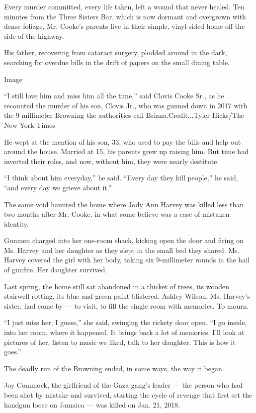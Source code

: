 Every murder committed, every life taken, left a wound that never
healed. Ten minutes from the Three Sisters Bar, which is now dormant and
overgrown with dense foliage, Mr. Cooke's parents live in their simple,
vinyl-sided home off the side of the highway.

His father, recovering from cataract surgery, plodded around in the
dark, searching for overdue bills in the drift of papers on the small
dining table.

Image

``I still love him and miss him all the time,'' said Clovis Cooke Sr.,
as he recounted the murder of his son, Clovis Jr., who was gunned down
in 2017 with the 9-millimeter Browning the authorities call
Briana.Credit...Tyler Hicks/The New York Times

He wept at the mention of his son, 33, who used to pay the bills and
help out around the house. Married at 15, his parents grew up raising
him. But time had inverted their roles, and now, without him, they were
nearly destitute.

``I think about him everyday,'' he said. ``Every day they kill people,''
he said, ``and every day we grieve about it.''

The same void haunted the home where Jody Ann Harvey was killed less
than two months after Mr. Cooke, in what some believe was a case of
mistaken identity.

Gunmen charged into her one-room shack, kicking open the door and firing
on Ms. Harvey and her daughter as they slept in the small bed they
shared. Ms. Harvey covered the girl with her body, taking six
9-millimeter rounds in the hail of gunfire. Her daughter survived.

Last spring, the home still sat abandoned in a thicket of trees, its
wooden stairwell rotting, its blue and green paint blistered. Ashley
Wilson, Ms. Harvey's sister, had come by --- to visit, to fill the
single room with memories. To mourn.

``I just miss her, I guess,'' she said, swinging the rickety door open.
``I go inside, into her room, where it happened. It brings back a lot of
memories. I'll look at pictures of her, listen to music we liked, talk
to her daughter. This is how it goes.''

The deadly run of the Browning ended, in some ways, the way it began.

Joy Commock, the girlfriend of the Gaza gang's leader --- the person who
had been shot by mistake and survived, starting the cycle of revenge
that first set the handgun loose on Jamaica --- was killed on Jan. 21,
2018.

